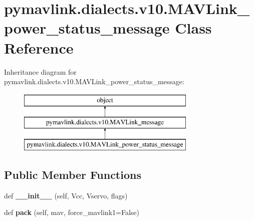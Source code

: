 \hypertarget{classpymavlink_1_1dialects_1_1v10_1_1MAVLink__power__status__message}{}\section{pymavlink.\+dialects.\+v10.\+M\+A\+V\+Link\+\_\+power\+\_\+status\+\_\+message Class Reference}
\label{classpymavlink_1_1dialects_1_1v10_1_1MAVLink__power__status__message}
Inheritance diagram for pymavlink.\+dialects.\+v10.\+M\+A\+V\+Link\+\_\+power\+\_\+status\+\_\+message\+:\begin{figure}[H]
\begin{center}
\leavevmode
\includegraphics[height=3.000000cm]{classpymavlink_1_1dialects_1_1v10_1_1MAVLink__power__status__message}
\end{center}
\end{figure}
\subsection*{Public Member Functions}
\begin{DoxyCompactItemize}
\item 
\mbox{\label{classpymavlink_1_1dialects_1_1v10_1_1MAVLink__power__status__message_aea43aa3e0cde975b60f12f3313bd24ba}} 
def {\bfseries \+\_\+\+\_\+init\+\_\+\+\_\+} (self, Vcc, Vservo, flags)
\item 
\mbox{\label{classpymavlink_1_1dialects_1_1v10_1_1MAVLink__power__status__message_ac4de744b29a57d0f5bb0839b000a8127}} 
def {\bfseries pack} (self, mav, force\+\_\+mavlink1=False)
\end{DoxyCompactItemize}
